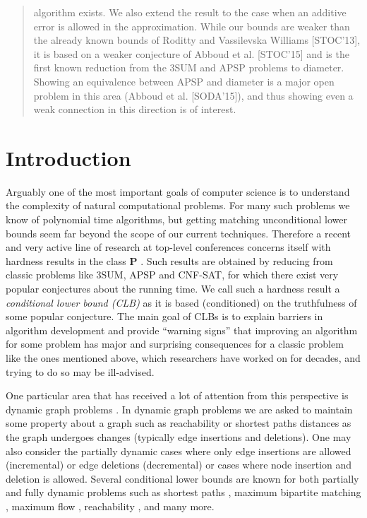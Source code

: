 \documentclass[a4paper,11pt]{article}
\theoremstyle{definition}
\begin{document}
\begin{abstract}
\begin{itemize}
            algorithm exists. We also extend the result to the case when an
            additive error is allowed in the approximation. While our bounds
            are weaker than the already known bounds of Roditty and Vassilevska
            Williams [STOC'13], it is based on a weaker conjecture of Abboud et
            al. [STOC'15] and is the first known reduction from the 3SUM
            and APSP problems to diameter.
            Showing an equivalence between APSP and diameter is a major open
            problem in this area (Abboud et al. [SODA'15]), and thus showing
            even a weak connection in this direction is of interest.
    \end{itemize}
\end{abstract}

\section{Introduction}
Arguably one of the most important goals of computer science is to understand
the complexity of natural computational problems. For many such problems we
know of polynomial time algorithms, but getting matching unconditional lower
bounds seem far beyond the scope of our current techniques. Therefore a recent
and very active line of research at top-level conferences concerns itself with
hardness results in the class \textbf{P}
\cite{Patrascu10,AbboudV14,AbboudVY15,HenzingerKNS15,KopelowitzPP16,AbboudGV15,ChechikLRSTW14,AbboudHVW16,CairoGR16,BringmannK15,BackursI15,AbboudBW15,AbboudBW15a}. Such
results are obtained by reducing from classic problems like 3SUM, APSP and
CNF-SAT, for which there exist very popular conjectures about the running time.
We call such a hardness result a \emph{conditional lower bound (CLB)} as it is
based (conditioned) on the truthfulness of some popular conjecture. The main
goal of CLBs is to explain barriers in algorithm development and provide
``warning signs'' that improving an algorithm for some problem has major and
surprising consequences for a classic problem like the ones mentioned above,
which researchers have worked on for decades, and trying to do so may be
ill-advised.

One particular area that has received a lot of attention from this perspective
is dynamic graph problems
\cite{RodittyZ11,Patrascu10,AbboudV14,AbboudVY15,HenzingerKNS15,KopelowitzPP16}.
In dynamic graph problems we are asked to maintain some property about a
graph such as reachability or shortest paths distances as the graph undergoes
changes (typically edge insertions and deletions). One may also consider the
partially dynamic cases where only edge insertions are allowed (incremental) or
edge deletions (decremental) or cases where node insertion and deletion is
allowed. Several conditional lower bounds are known for both partially and
fully dynamic problems such as shortest paths \cite{RodittyZ11,HenzingerKNS15},
maximum bipartite matching \cite{AbboudV14,HenzingerKNS15,KopelowitzPP16},
maximum flow \cite{AbboudVY15}, reachability
\cite{Patrascu10,AbboudV14,HenzingerKNS15}, and many more.
\end{document}
